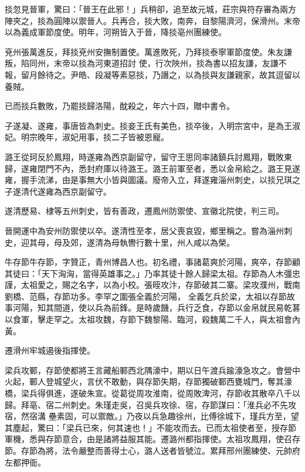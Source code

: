 \begin{pinyinscope}
 掞忽見晉軍，驚曰：「晉王在此邪！」兵稍卻，追至故元城，莊宗與符存審為兩方陣夾之，掞為圓陣以禦晉人。兵再合，掞大敗，南奔，自黎陽濟河，保滑州。末帝以為義成軍節度使。明年，河朔皆入于晉，降掞亳州團練使。



 兗州張萬進反，拜掞兗州安撫制置使。萬進敗死，乃拜掞泰寧軍節度使。朱友謙叛，陷同州，末帝以掞為河東道招討
 使，行次陜州，掞為書以招友謙，友謙不報，留月餘待之。尹皓、段凝等素惡掞，乃譖之，以為掞與友謙親家，故其逗留以養賊。



 已而掞兵數敗，乃罷掞歸洛陽，酖殺之，年六十四，贈中書令。



 子遂凝、遂雍，事唐皆為刺史。掞妾王氏有美色，掞卒後，入明宗宮中，是為王淑妃。明宗晚年，淑妃用事，掞二子皆被恩寵。



 潞王從珂反於鳳翔，時遂雍為西京副留守，留守王思同率諸鎮兵討鳳翔，戰敗東歸，遂雍閉門不內，悉封府庫以待潞王。潞王前軍至者，悉以金帛給之。潞王見遂雍，握手流涕，由是事無大小皆與圖議。廢帝入立，拜遂雍淄州刺史，以掞兄琪之
 子遂清代遂雍為西京副留守。



 遂清歷易、棣等五州刺史，皆有善政，遷鳳州防禦使、宣徽北院使，判三司。



 晉開運中為安州防禦使以卒。遂清性至孝，居父喪哀毀，鄉里稱之。嘗為淄州刺史，迎其母，母及郊，遂清為母執轡行數十里，州人咸以為榮。



 牛存節牛存節，字贊正，青州博昌人也。初名禮，事諸葛爽於河陽，爽卒，存節顧其徒曰：「天下洶洶，當得英雄事之。」乃率其徒十餘人歸梁太祖。存節為人木彊忠謹，太祖愛之，賜之名字，以為小校。張晊攻汴，存節破其二寨。梁攻濮州，戰南劉橋、范縣，存節功多。李罕之圍張全義於河陽，
 全義乞兵於梁，太祖以存節故事河陽，知其間道，使以兵為前鋒。是時歲饑，兵行乏食，存節以金帛就民易乾葚以食軍，擊走罕之。太祖攻魏，存節下魏黎陽、臨河，殺魏萬二千人，與太祖會內黃。



 遷滑州牢城遏後指揮使。



 梁兵攻鄆，存節使都將王言藏船鄆西北隅濠中，期以日午渡兵踰濠急攻之。會營中火起，鄆人登城望火，言伏不敢動，與存節失期，存節獨破鄆西甕城門，奪其濠橋，梁兵得俱進，遂破朱宣。從葛從周攻淮南，從周敗渒河，存節收其散卒八千以歸。拜亳、宿二州刺史。朱瑾走吳，召吳兵攻徐、宿，存節謀曰：「淮兵必不先攻宿，然宿溝
 壘素固，可以禦敵。」乃夜以兵急趣徐州，比傅徐城下，瑾兵方至，望其塵起，驚曰：「梁兵已來，何其速也！」不能攻而去。已而太祖使者至，授存節軍機，悉與存節意合，由是諸將益服其能。遷潞州都指揮使。太祖攻鳳翔，使召存節。存節為將，法令嚴整而善得士心，潞人送者皆號泣。累拜邢州團練使、元帥府左都押衙。




\end{pinyinscope}
